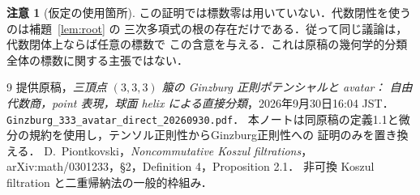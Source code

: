 \documentclass[a4paper,11pt]{ltjsarticle}
\theoremstyle{definition}
\newtheorem{remark}[theorem]{注意}
\begin{document}
\begin{remark}[仮定の使用箇所]
この証明では標数零は用いていない．代数閉性を使うのは補題~\ref{lem:root} の
三次多項式の根の存在だけである．従って同じ議論は，代数閉体上ならば任意の標数で
この含意を与える．これは原稿の幾何学的分類全体の標数に関する主張ではない．
\end{remark}

\begin{samepage}\begin{thebibliography}{9}
提供原稿，\emph{三頂点 $(3,3,3)$ 箙の Ginzburg 正則ポテンシャルと avatar：
自由代数商，point 表現，球面 helix による直接分類}，2026年9月30日16:04 JST．
\texttt{Ginzburg\_333\_avatar\_direct\_20260930.pdf}．
本ノートは同原稿の定義1.1と微分の規約を使用し，テンソル正則性からGinzburg正則性への
証明のみを置き換える．
D.~Piontkovski，\emph{Noncommutative Koszul filtrations}，
arXiv:math/0301233，\S2，Definition 4，Proposition 2.1．
非可換 Koszul filtration と二重帰納法の一般的枠組み．
\end{thebibliography}\end{samepage}
\end{document}
